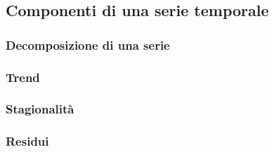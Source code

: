 \subsection{Componenti di una serie temporale}

\subsubsection{Decomposizione di una serie}
\subsubsection{Trend}
\subsubsection{Stagionalità}
\subsubsection{Residui}


